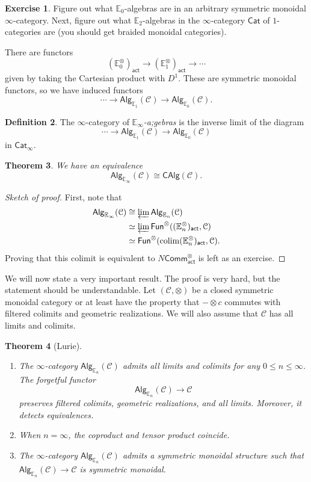 \documentclass[10pt]{amsart}
\newtheorem{thm}{Theorem}[subsection]
\theoremstyle{definition}
\newtheorem{defn}[thm]{Definition}
\newtheorem{exer}[thm]{Exercise}
\theoremstyle{remark}
\theoremstyle{plain}
\theoremstyle{definition}
\theoremstyle{remark}
\newcommand{\E}{\mathbb{E}}
\newcommand{\mc}[1]{\mathcal{#1}}
\newcommand{\ms}[1]{\mathsf{#1}}
\newcommand{\1}{\mathbf{1}}
\newcommand{\2}{\mathbf{2}}
\newcommand{\3}{\mathbf{3}}
\DeclareMathOperator*{\colim}{colim}
\begin{document}
\begin{exer}
    Figure out what $\E_0$-algebras are in an arbitrary symmetric monoidal $\infty$-category. Next, figure out what $\E_2$-algebras in the $\infty$-category $\ms{Cat}$ of $1$-categories are (you should get braided monoidal categories).
\end{exer}

There are functors
\[ (\E_0^{\otimes})_{\ms{act}} \to (\E_1^{\otimes})_{\ms{act}} \to \cdots \]
given by taking the Cartesian product with $D^1$. These are symmetric monoidal functors, so we have induced functors
\[ \cdots \to \ms{Alg}_{\E_1}(\mc{C}) \to \ms{Alg}_{\E_0}(\mc{C}). \]

\begin{defn}
    The $\infty$-category of \textit{$\E_{\infty}$-a;gebras} is the inverse limit of the diagram
    \[ \cdots \to \ms{Alg}_{\E_1}(\mc{C}) \to \ms{Alg}_{\E_0}(\mc{C}) \]
    in $\ms{Cat}_{\infty}$.
\end{defn}

\begin{thm}
    We have an equivalence
    \[ \ms{Alg}_{\E_{\infty}}(\mc{C}) \cong \ms{CAlg}(\mc{C}). \]
\end{thm}

\begin{proof}[Sketch of proof]
    First, note that
    \begin{align*}
        \ms{Alg}_{\E_{\infty}}(\mc{C}) &\cong \varprojlim \ms{Alg}_{\E_n}(\mc{C}) \\
        &\simeq \varprojlim \ms{Fun}^{\otimes}((\E_n^{\otimes})_{\ms{act}}, \mc{C}) \\
        &\simeq \ms{Fun}^{\otimes} (\colim (\E_n^{\otimes})_{\ms{act}}, \mc{C}).
    \end{align*}
    Proving that this colimit is equivalent to $N \ms{Comm}_{\ms{act}}^{\otimes}$ is left as an exercise.
\end{proof}

We will now state a very important result. The proof is very hard, but the statement should be understandable. Let $(\mc{C}, \otimes)$ be a closed symmetric monoidal category or at least have the property that $-\otimes c$ commutes with filtered colimits and geometric realizations. We will also assume that $\mc{C}$ has all limits and colimits.

\begin{thm}[Lurie]\leavevmode
    \begin{enumerate}
        \item The $\infty$-category $\ms{Alg}_{\E_n}(\mc{C})$ admits all limits and colimits for any $0 \leq n \leq \infty$. The forgetful functor
        \[ \ms{Alg}_{\E_n}(\mc{C}) \to \mc{C} \]
        preserves filtered colimits, geometric realizations, and all limits. Moreover, it detects equivalences.
        \item When $n = \infty$, the coproduct and tensor product coincide.
        \item The $\infty$-category $\ms{Alg}_{\E_n}(\mc{C})$ admits a symmetric monoidal structure such that $\ms{Alg}_{\E_n}(\mc{C}) \to \mc{C}$ is symmetric monoidal.
    \end{enumerate}
\end{thm}
\end{document}
